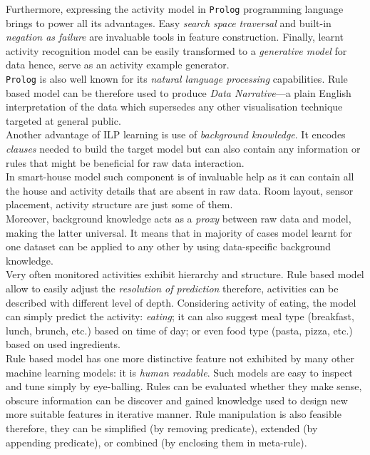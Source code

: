 \documentclass[11pt, a4paper, pdflatex, leqno, twoside, openright]{report}
\begin{document}
Furthermore, expressing the activity model in \texttt{Prolog} programming language brings to power all its advantages. Easy \emph{search space traversal} and built-in \emph{negation as failure} are invaluable tools in feature construction. Finally, learnt activity recognition model can be easily transformed to a \emph{generative model} for data hence, serve as an activity example generator.\\
\texttt{Prolog} is also well known for its \emph{natural language processing} capabilities. Rule based model can be therefore used to produce \emph{Data Narrative}---a plain English interpretation of the data which supersedes any other visualisation technique targeted at general public.\\

Another advantage of ILP learning is use of \emph{background knowledge}. It encodes \emph{clauses} needed to build the target model but can also contain any information or rules that might be beneficial for raw data interaction.\\
In smart-house model such component is of invaluable help as it can contain all the house and activity details that are absent in raw data. Room layout, sensor placement, activity structure are just some of them.\\
Moreover, background knowledge acts as a \emph{proxy} between raw data and model, making the latter universal. It means that in majority of cases model learnt for one dataset can be applied to any other by using data-specific background knowledge.\\

Very often monitored activities exhibit hierarchy and structure. Rule based model allow to easily adjust the \emph{resolution of prediction} therefore, activities can be described with different level of depth. Considering activity of eating, the model can simply predict the activity: \emph{eating}; it can also suggest meal type (breakfast, lunch, brunch, etc.) based on time of day; or even food type (pasta, pizza, etc.) based on used ingredients.\\

Rule based model has one more distinctive feature not exhibited by many other machine learning models: it is \emph{human readable}. Such models are easy to inspect and tune simply by eye-balling. Rules can be evaluated whether they make sense, obscure information can be discover and gained knowledge used to design new more suitable features in iterative manner. Rule manipulation is also feasible therefore, they can be simplified (by removing predicate), extended (by appending predicate), or combined (by enclosing them in meta-rule).\\
\end{document}
